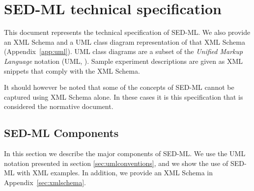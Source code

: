 \chapter{SED-ML technical specification}
\label{chp:specification}

This document represents the technical specification of SED-ML. We also provide an XML Schema \citep{xmls} and a UML class diagram representation of that XML Schema (Appendix~\ref{app:uml}). UML class diagrams are a subset of the \emph{Unified Markup Language} notation (UML, \citep{uml22}). Sample experiment descriptions are given as XML snippets that comply with the XML Schema.

It should however be noted that some of the concepts of SED-ML cannot be captured using XML Schema alone. In these cases it is this specification that is considered the normative document. 








\section{SED-ML Components}
In this section we describe the major components of SED-ML. We use the UML notation presented in section \ref{sec:umlconventions}, and we show the use of SED-ML with XML examples. In addition, we provide an XML Schema in Appendix~\ref{sec:xmlschema}.


  




















